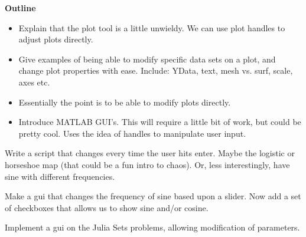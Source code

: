 

{\bf Outline}

\begin{itemize}
\item Explain that the plot tool is a little unwieldy. We can use plot handles to adjust plots directly.
\item Give examples of being able to modify specific data sets on a plot, and change plot properties with ease. Include: YData, text, mesh vs. surf, scale, axes etc.
\item Essentially the point is to be able to modify plots directly.
\item Introduce MATLAB GUI's. This will require a little bit of work, but could be pretty cool. Uses the idea of handles to manipulate user input.
\end{itemize}

\begin{problem}
Write a script that changes every time the user hits enter. Maybe the logistic or horseshoe map (that could be a fun intro to chaos). Or, less interestingly, have sine with different frequencies.
\end{problem}

\begin{problem}
Make a gui that changes the frequency of sine based upon a slider. Now add a set of checkboxes that allows us to show sine and/or cosine.
\end{problem}

\begin{problem}
Implement a gui on the Julia Sets problems, allowing modification of parameters.
\end{problem}